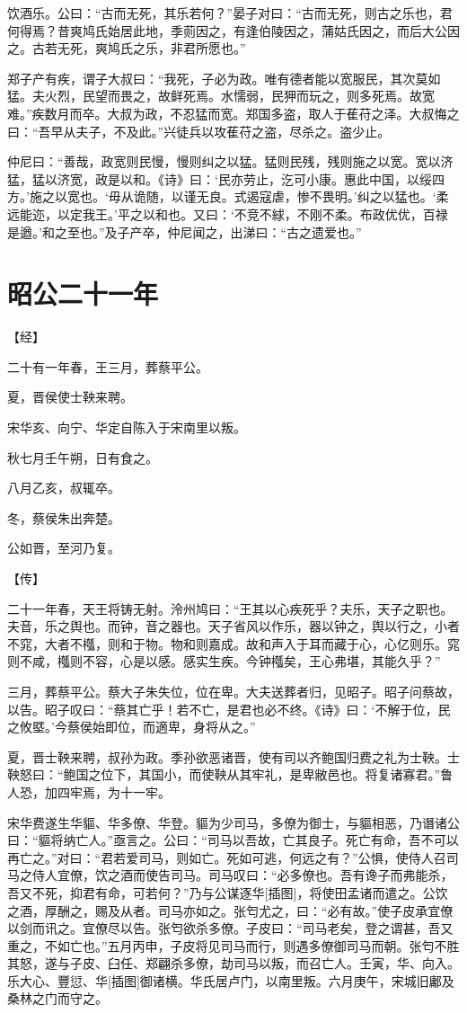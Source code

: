 \documentclass[a4paper,12pt,UTF8,twoside]{ctexbook}
\begin{document}
饮酒乐。公曰：“古而无死，其乐若何？”晏子对曰：“古而无死，则古之乐也，君何得焉？昔爽鸠氏始居此地，季荝因之，有逢伯陵因之，蒲姑氏因之，而后大公因之。古若无死，爽鸠氏之乐，非君所愿也。”

郑子产有疾，谓子大叔曰：“我死，子必为政。唯有德者能以宽服民，其次莫如猛。夫火烈，民望而畏之，故鲜死焉。水懦弱，民狎而玩之，则多死焉。故宽难。”疾数月而卒。大叔为政，不忍猛而宽。郑国多盗，取人于萑苻之泽。大叔悔之曰：“吾早从夫子，不及此。”兴徒兵以攻萑苻之盗，尽杀之。盗少止。

仲尼曰：“善哉，政宽则民慢，慢则纠之以猛。猛则民残，残则施之以宽。宽以济猛，猛以济宽，政是以和。《诗》曰：‘民亦劳止，汔可小康。惠此中国，以绥四方。’施之以宽也。‘毋从诡随，以谨无良。式遏寇虐，惨不畏明。’纠之以猛也。‘柔远能迩，以定我王。’平之以和也。又曰：‘不竞不絿，不刚不柔。布政优优，百禄是遒。’和之至也。”及子产卒，仲尼闻之，出涕曰：“古之遗爱也。”


\section{昭公二十一年}


【经】

二十有一年春，王三月，葬蔡平公。

夏，晋侯使士鞅来聘。

宋华亥、向宁、华定自陈入于宋南里以叛。

秋七月壬午朔，日有食之。

八月乙亥，叔辄卒。

冬，蔡侯朱出奔楚。

公如晋，至河乃复。

【传】

二十一年春，天王将铸无射。泠州鸠曰：“王其以心疾死乎？夫乐，天子之职也。夫音，乐之舆也。而钟，音之器也。天子省风以作乐，器以钟之，舆以行之，小者不窕，大者不槬，则和于物。物和则嘉成。故和声入于耳而藏于心，心亿则乐。窕则不咸，槬则不容，心是以感。感实生疾。今钟槬矣，王心弗堪，其能久乎？”

三月，葬蔡平公。蔡大子朱失位，位在卑。大夫送葬者归，见昭子。昭子问蔡故，以告。昭子叹曰：“蔡其亡乎！若不亡，是君也必不终。《诗》曰：‘不解于位，民之攸塈。’今蔡侯始即位，而適卑，身将从之。”

夏，晋士鞅来聘，叔孙为政。季孙欲恶诸晋，使有司以齐鲍国归费之礼为士鞅。士鞅怒曰：“鲍国之位下，其国小，而使鞅从其牢礼，是卑敝邑也。将复诸寡君。”鲁人恐，加四牢焉，为十一牢。

宋华费遂生华貙、华多僚、华登。貙为少司马，多僚为御士，与貙相恶，乃谮诸公曰：“貙将纳亡人。”亟言之。公曰：“司马以吾故，亡其良子。死亡有命，吾不可以再亡之。”对曰：“君若爱司马，则如亡。死如可逃，何远之有？”公惧，使侍人召司马之侍人宜僚，饮之酒而使告司马。司马叹曰：“必多僚也。吾有谗子而弗能杀，吾又不死，抑君有命，可若何？”乃与公谋逐华[插图]，将使田孟诸而遣之。公饮之酒，厚酬之，赐及从者。司马亦如之。张匄尤之，曰：“必有故。”使子皮承宜僚以剑而讯之。宜僚尽以告。张匄欲杀多僚。子皮曰：“司马老矣，登之谓甚，吾又重之，不如亡也。”五月丙申，子皮将见司马而行，则遇多僚御司马而朝。张匄不胜其怒，遂与子皮、臼任、郑翩杀多僚，劫司马以叛，而召亡人。壬寅，华、向入。乐大心、豐愆、华[插图]御诸横。华氏居卢门，以南里叛。六月庚午，宋城旧鄘及桑林之门而守之。
\end{document}
